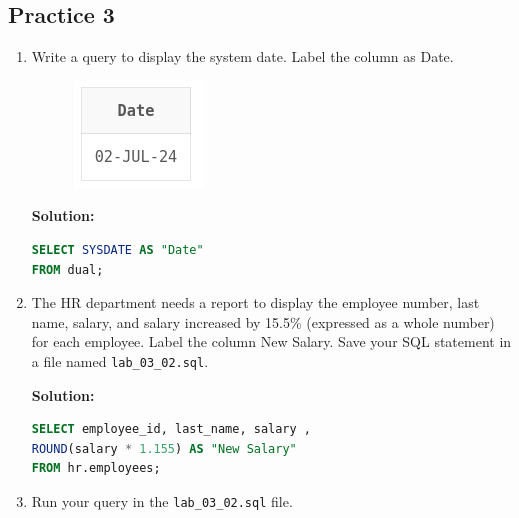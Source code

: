 \documentclass[a4paper,12pt]{article}
\begin{document}
\subsection*{Practice 3}
\begin{enumerate}
    \item Write a query to display the system date. Label the column as Date.
    \begin{figure}[h]
        \centering
        \includegraphics*[width=.2\linewidth]{graphics/31.png}
    \end{figure}

    \textbf{Solution: }
        \begin{lstlisting}[language=SQL, label={lst:employees_data}]
SELECT SYSDATE AS "Date"
FROM dual;
    \end{lstlisting}
    \item The HR department needs a report to display the employee number, last name, salary, and
salary increased by 15.5\% (expressed as a whole number) for each employee. Label the column
New Salary. Save your SQL statement in a file named \texttt{lab\_03\_02.sql}.

    \textbf{Solution: }
        \begin{lstlisting}[language=SQL, label={lst:employees_data}]
SELECT employee_id, last_name, salary ,
ROUND(salary * 1.155) AS "New Salary"
FROM hr.employees;
    \end{lstlisting}

    \item Run your query in the \texttt{lab\_03\_02.sql} file.


\end{enumerate}
\end{document}

